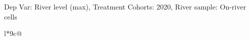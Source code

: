 \begin{table}[H]
\captionlistentry[table]{}
\label{table:beaver_hydrometry_DVlevel_max_SCg3}
\tiny %
Dep Var: River level (max), Treatment Cohorts: 2020, River sample: On-river cells \\
\begin{threeparttable}
\begin{tabulary}{\textwidth}{l*{9}{c}@{}}
\toprule \toprule
\noalign{\smallskip}
\noalign{\smallskip}
\midrule \bottomrule
\end{tabulary}
\medskip
\end{threeparttable}
\end{table}
